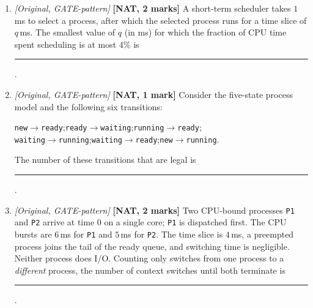 \documentclass[11pt]{article}
\begin{document}
\begin{enumerate}
\item[\textbf{Q8}] \textit{[Original, GATE-pattern]} \textbf{[NAT, 2 marks]} A short-term scheduler takes $1$\,ms to select a process, after which the selected process runs for a time slice of $q$\,ms. The smallest value of $q$ (in ms) for which the fraction of CPU time spent scheduling is at most $4\%$ is \rule{1.5cm}{0.4pt}.

\item[\textbf{Q9}] \textit{[Original, GATE-pattern]} \textbf{[NAT, 1 mark]} Consider the five-state process model and the following six transitions:
\begin{center}
\texttt{new}$\to$\texttt{ready};\quad \texttt{ready}$\to$\texttt{waiting};\quad \texttt{running}$\to$\texttt{ready};\\
\texttt{waiting}$\to$\texttt{running};\quad \texttt{waiting}$\to$\texttt{ready};\quad \texttt{new}$\to$\texttt{running}.
\end{center}
The number of these transitions that are legal is \rule{1.5cm}{0.4pt}.

\item[\textbf{Q10}] \textit{[Original, GATE-pattern]} \textbf{[NAT, 2 marks]} Two CPU-bound processes \texttt{P1} and \texttt{P2} arrive at time 0 on a single core; \texttt{P1} is dispatched first. The CPU bursts are $6$\,ms for \texttt{P1} and $5$\,ms for \texttt{P2}. The time slice is $4$\,ms, a preempted process joins the tail of the ready queue, and switching time is negligible. Neither process does I/O. Counting only switches from one process to a \emph{different} process, the number of context switches until both terminate is \rule{1.5cm}{0.4pt}.

\end{enumerate}
\end{document}
